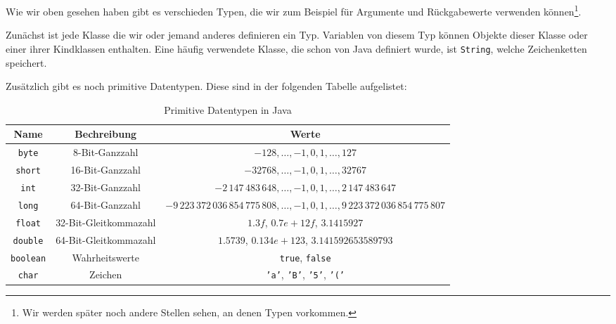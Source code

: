    Wie wir oben gesehen haben gibt es verschieden Typen, die wir zum Beispiel für Argumente und Rückgabewerte verwenden können\footnote{Wir werden später noch andere Stellen sehen, an denen Typen vorkommen.}.

    Zunächst ist jede Klasse die wir oder jemand anderes definieren ein Typ. Variablen von diesem Typ können Objekte dieser Klasse oder einer ihrer Kindklassen enthalten. Eine häufig verwendete Klasse, die schon von Java definiert wurde, ist \lstinline{String}, welche Zeichenketten speichert.

    Zusätzlich gibt es noch primitive Datentypen. Diese sind in der folgenden Tabelle aufgelistet:
    \begin{table}[h!]
        \centering
        \begin{tabular}{c|c|c}
        Name & Bechreibung & Werte \\
        \hline\hline
        \texttt{byte} & 8-Bit-Ganzzahl & \(-128,\dots, -1, 0, 1, \dots, 127\) \\
        \texttt{short} & 16-Bit-Ganzzahl & \(-32768, \dots, -1, 0, 1, \dots, 32767\)\\
        \texttt{int} & 32-Bit-Ganzzahl & \(-2\,147\,483\,648, \dots, -1, 0, 1, \dots ,2\,147\,483\,647\)\\
        \texttt{long} & 64-Bit-Ganzzahl & \(-9\,223\,372\,036\,854\,775\,808, \dots, -1, 0, 1, \dots ,9\,223\,372\,036\,854\,775\,807\)\\
        \hline
        \texttt{float} & 32-Bit-Gleitkommazahl & \(1.3f\), \(0.7e+12f\), \(3.1415927\) \\
        \texttt{double} & 64-Bit-Gleitkommazahl & \(1.5739\), \(0.134e+123\), \(3.141592653589793\) \\
        \hline
        \texttt{boolean} & Wahrheitswerte & \texttt{true}, \texttt{false} \\
        \texttt{char} & Zeichen & \texttt{'a'}, \texttt{'B'}, \texttt{'5'}, \texttt{'('} \\
        \end{tabular}
        \caption{Primitive Datentypen in Java}
        \label{tab:primitive_types}
    \end{table}
